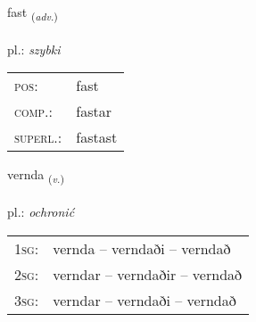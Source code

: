 \documentclass[frontgrid, backgrid]{flacards}\usepackage[]{graphicx}\usepackage[]{xcolor}
\begin{document}
\renewcommand{\flhead}{\vskip5pt \fboxsep=0pt {\small\bfseries\footnotesize Atviksorð | Adverb}}
\renewcommand{\fcfoot}{\vskip5pt \fboxsep=0pt \hspace{2pt}{\small\bfseries\footnotesize 2K}}

\renewcommand{\blhead}{\vskip5pt {\small\bfseries\footnotesize Atviksorð | Adverb }}
\renewcommand{\bcfoot}{\vskip5pt \hspace{2pt}{\small\bfseries\footnotesize 2K}}


{fast \small{\textsubscript{(\textit{adv.})}} \\[1ex] %
\textphonetic{[fast]} \\
pl.: \emph{szybki} \\  [2ex]
\renewcommand*{\arraystretch}{0.8}
\begin{tabular}{ll}
\textsc{pos}: & fast \\ 
\textsc{comp.}: & fastar \\ 
\textsc{superl.}: & fastast \\
\end{tabular}
}

\renewcommand{\flhead}{\vskip5pt \fboxsep=0pt {\small\bfseries\footnotesize Sagnorð | Verb}}
\renewcommand{\fcfoot}{\vskip5pt \fboxsep=0pt \hspace{2pt}{\small\bfseries\footnotesize 2K}}

\renewcommand{\blhead}{\vskip5pt {\small\bfseries\footnotesize Sagnorð | Verb }}
\renewcommand{\bcfoot}{\vskip5pt \hspace{2pt}{\small\bfseries\footnotesize 2K}}


{vernda \small{\textsubscript{(\textit{v.})}} \\[1ex] %
\textphonetic{[vɛrnta]} \\
pl.: \emph{ochronić} \\  [2ex]
\renewcommand*{\arraystretch}{0.8}
\begin{tabular}{p{1cm}l}
\textsc{1sg}: & vernda -- verndaði -- verndað \\ 
\textsc{2sg}: & verndar -- verndaðir -- verndað \\ 
\textsc{3sg}: & verndar -- verndaði -- verndað \\ 
\end{tabular}
}
\end{document}
